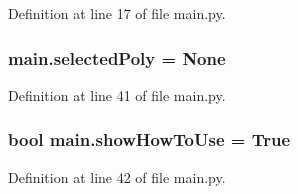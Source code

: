 Definition at line 17 of file main.\+py.

\subsubsection[{\texorpdfstring{selected\+Poly}{selectedPoly}}]{\setlength{\rightskip}{0pt plus 5cm}main.\+selected\+Poly = None}\hypertarget{namespacemain_a1db6f501c5570dc08a064510cb9e71a8}{}\label{namespacemain_a1db6f501c5570dc08a064510cb9e71a8}


Definition at line 41 of file main.\+py.

\subsubsection[{\texorpdfstring{show\+How\+To\+Use}{showHowToUse}}]{\setlength{\rightskip}{0pt plus 5cm}bool main.\+show\+How\+To\+Use = True}\hypertarget{namespacemain_a52a1046251ec3805410ab8f60b921d57}{}\label{namespacemain_a52a1046251ec3805410ab8f60b921d57}


Definition at line 42 of file main.\+py.

